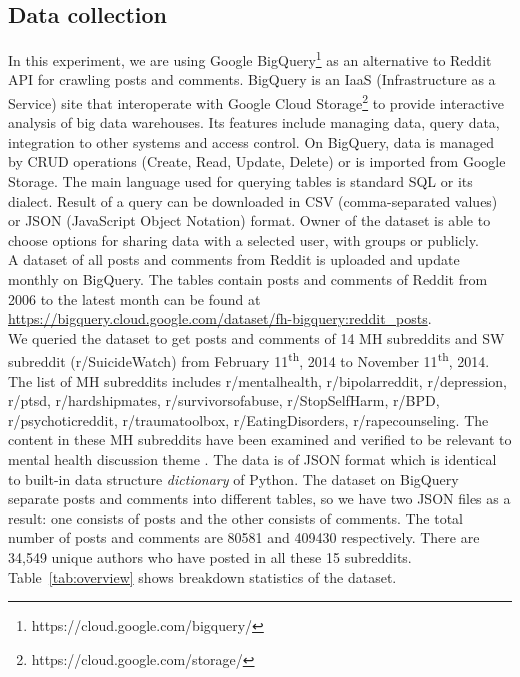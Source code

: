 \subsection{Data collection}
In this experiment, we are using Google BigQuery\footnote{https://cloud.google.com/bigquery/} as an alternative to Reddit API for crawling posts and comments. BigQuery is an IaaS (Infrastructure as a Service) site that interoperate with Google Cloud Storage\footnote{https://cloud.google.com/storage/} to provide interactive analysis of big data warehouses. Its features include managing data, query data, integration to other systems and access control. On BigQuery, data is managed by CRUD operations (Create, Read, Update, Delete) or is imported from Google Storage. The main language used for querying tables is standard SQL or its dialect. Result of a query can be downloaded in CSV (comma-separated values) or JSON (JavaScript Object Notation) format. Owner of the dataset is able to choose options for sharing data with a selected user, with groups or publicly.\\
A dataset of all posts and comments from Reddit is uploaded and update monthly on BigQuery. The tables contain posts and comments of Reddit from 2006 to the latest month can be found at \url{https://bigquery.cloud.google.com/dataset/fh-bigquery:reddit_posts}.\\
We queried the dataset to get posts and comments of 14 MH subreddits and SW subreddit (r/SuicideWatch) from February 11\textsuperscript{th}, 2014 to November 11\textsuperscript{th}, 2014. The list of MH subreddits includes r/mentalhealth, r/bipolarreddit, r/depression, r/ptsd, r/hardshipmates, r/survivorsofabuse, r/StopSelfHarm, r/BPD,  r/psychoticreddit, r/traumatoolbox, r/EatingDisorders, r/rapecounseling. The content in these MH subreddits have been examined and verified to be relevant to mental health discussion theme \cite{Pavalanathan2015}. The data is of JSON format which is identical to built-in data structure \textit{dictionary} of Python. The dataset on BigQuery separate posts and comments into different tables, so we have two JSON files as a result: one consists of posts and the other consists of comments. The total number of posts and comments are 80581 and 409430 respectively. There are 34,549 unique authors who have posted in all these 15 subreddits. Table~\ref{tab:overview} shows breakdown statistics of the dataset.\\
